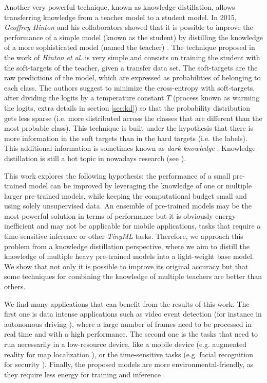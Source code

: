 \documentclass{elsarticle}
\begin{document}
	Another very powerful technique, known as knowledge distillation, allows transferring knowledge from a teacher model to a student model. In 2015, \textit{Geoffrey Hinton} and his collaborators showed that it is possible to improve the performance of a simple model (known as the student) by distilling the knowledge of a more sophisticated model (named the teacher) \citep{hinton2015}. The technique proposed in the work of \textit{Hinton et al.} is very simple and consists on training the student with the soft-targets of the teacher, given a transfer data set. The soft-targets are the raw predictions of the model, which are expressed as probabilities of belonging to each class. The authors suggest to minimize the cross-entropy with soft-targets, after dividing the logits by a temperature constant $T$ (process known as warming the logits, extra details in section \ref{sec:kd}) so that the probability distribution gets less sparse (i.e. more distributed across the classes that are different than the most probable class). This technique is built under the hypothesis that there is more information in the soft targets than in the hard targets (i.e. the labels). This additional information is sometimes known as \textit{dark knowledge} \citep{gou2020}. Knowledge distillation is still a hot topic in nowadays research (see \citep{tan2021, zhao2021, lee2021}).

	 This work explores the following hypothesis: the performance of a small pre-trained model can be improved by leveraging the knowledge of one or multiple larger pre-trained models, while keeping the computational budget small and using solely unsupervised data. An ensemble of pre-trained models may be the most powerful solution in terms of performance but it is obviously energy-inefficient and may not be applicable for mobile applications, tasks that require a time-sensitive inference \citep{sanchez2020} or other \textit{TinyML} tasks. Therefore, we approach this problem from a knowledge distillation perspective, where we aim to distill the knowledge of multiple heavy pre-trained models into a light-weight base model. We show that not only it is possible to improve its original accuracy but that some techniques for combining the knowledge of multiple teachers are better than others. 
	 
	 We find many applications that can benefit from the results of this work. The first one is data intense applications such as video event detection \cite{chakraborty2021} (for instance in autonomous driving \cite{swaminathan2019}), where a large number of frames need to be processed in real time and with a high performance. The second one is the tasks that need to run necessarily in a low-resource device, like a mobile device (e.g. augmented reality for map localization \cite{limmer2017}), or the time-sensitive tasks (e.g. facial recognition for security \cite{aung2021}). Finally, the proposed models are more environmental-friendly, as they require less energy for training and inference \cite{wu2022sustainable}.
\end{document}
